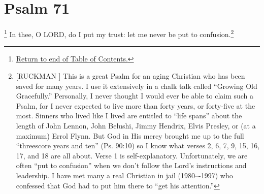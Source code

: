\chapter{Psalm 71}
\footnote{\textcolor[rgb]{0.00,0.25,0.00}{\hyperlink{TOC}{Return to end of Table of Contents.}}}
\textcolor[rgb]{0.00,0.00,1.00}{In thee, O LORD, do I put my trust: let me never be put to confusion.}\footnote{[RUCKMAN ] This is a great Psalm for an aging Christian who has been saved for many years. I use it extensively in a chalk talk called “Growing Old Gracefully.” Personally, I never thought I would ever be able to claim such a Psalm, for I never expected to live more than forty years, or forty-five at the most. Sinners who lived like I lived are entitled to “life spans” about the length of John Lennon, John Belushi, Jimmy Hendrix, Elvis Presley, or (at a maximum) Errol Flynn. But God in His mercy brought me up to the full “threescore years and ten” (Ps. 90:10) so I know what verses 2, 6, 7, 9, 15, 16, 17, and 18 are all about.  Verse 1 is self-explanatory. Unfortunately, we
are often “put to confusion” when we don’t follow the Lord’s instructions and leadership. I
have met many a real Christian in jail (1980–-1997) who confessed that God had to put him
there to “get his attention.”\cite{Ruckman1992Psalms}}
